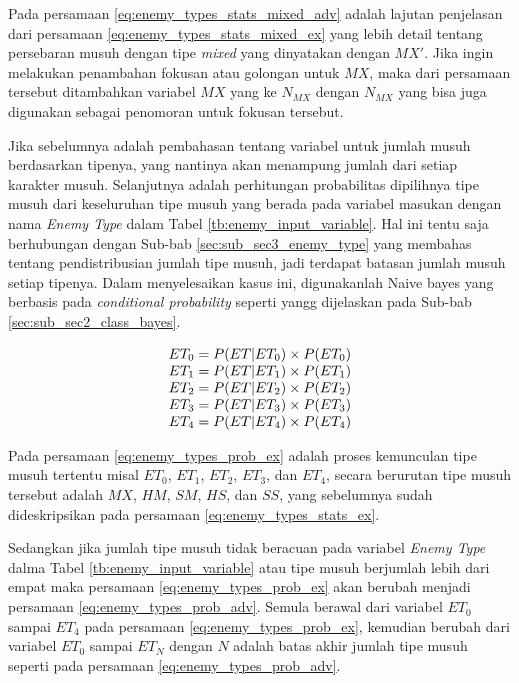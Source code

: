 Pada persamaan \ref{eq:enemy_types_stats_mixed_adv} adalah lajutan penjelasan dari persamaan \ref{eq:enemy_types_stats_mixed_ex} yang lebih detail tentang persebaran musuh dengan tipe \textit{mixed} yang dinyatakan dengan $MX'$. Jika ingin melakukan penambahan fokusan atau golongan untuk $MX$, maka dari persamaan tersebut ditambahkan variabel $MX$ yang ke $N_{MX}$ dengan $N_{MX}$ yang bisa juga digunakan sebagai penomoran untuk fokusan tersebut.
\vspace{1ex}

Jika sebelumnya adalah pembahasan tentang variabel untuk jumlah musuh berdasarkan tipenya, yang nantinya akan menampung jumlah dari setiap karakter musuh. Selanjutnya adalah perhitungan probabilitas dipilihnya tipe musuh dari keseluruhan tipe musuh yang berada pada variabel masukan dengan nama \textit{Enemy Type} dalam Tabel \ref{tb:enemy_input_variable}. Hal ini tentu saja berhubungan dengan Sub-bab \ref{sec:sub_sec3_enemy_type} yang membahas tentang pendistribusian jumlah tipe musuh, jadi terdapat batasan jumlah musuh setiap tipenya. Dalam menyelesaikan kasus ini, digunakanlah Naive bayes yang berbasis pada \textit{conditional probability} seperti yangg dijelaskan pada Sub-bab \ref{sec:sub_sec2_class_bayes}.
\vspace{1ex}

\begin{equation}\label{eq:enemy_types_prob_ex}
\resizebox{0.38\textwidth}{!}{%
	$\begin{matrix}
	ET_{0} = P(ET | ET_{0}) \times P(ET_{0})\\
	ET_{1} = P(ET | ET_{1}) \times P(ET_{1})\\
	ET_{2} = P(ET | ET_{2}) \times P(ET_{2})\\
	ET_{3} = P(ET | ET_{3}) \times P(ET_{3})\\
	ET_{4} = P(ET | ET_{4}) \times P(ET_{4})
	\end{matrix}$%
}
\end{equation}

Pada persamaan \ref{eq:enemy_types_prob_ex} adalah proses kemunculan tipe musuh tertentu misal $ET_{0}$, $ET_{1}$, $ET_{2}$, $ET_{3}$, dan $ET_{4}$, secara berurutan tipe musuh tersebut adalah $MX$, $HM$, $SM$, $HS$, dan $SS$, yang sebelumnya sudah dideskripsikan pada persamaan \ref{eq:enemy_types_stats_ex}.
\vspace{1ex}

Sedangkan jika jumlah tipe musuh tidak beracuan pada variabel \textit{Enemy Type} dalma Tabel \ref{tb:enemy_input_variable} atau tipe musuh berjumlah lebih dari empat maka persamaan \ref{eq:enemy_types_prob_ex} akan berubah menjadi persamaan \ref{eq:enemy_types_prob_adv}. Semula berawal dari variabel $ET_{0}$ sampai $ET_{4}$ pada persamaan \ref{eq:enemy_types_prob_ex}, kemudian berubah dari variabel $ET_{0}$ sampai $ET_{N}$ dengan $N$ adalah batas akhir jumlah tipe musuh seperti pada persamaan \ref{eq:enemy_types_prob_adv}.
\vspace{1ex}

